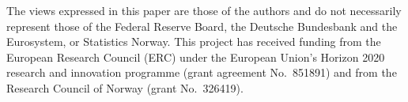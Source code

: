 \documentclass[\latexroot/\projectname]{subfiles}
\begin{document}

\newcommand{\thanksInput}[1]{%
  \IfFileExists{\latexroot/Subfiles/#1.tex}%
  {\ignorespaces\unskip}%
  {}%
}%

\whenintegrated{\label{funding-info}} %
\vspace{0.3\baselineskip}
\begin{minipage}{\textwidth}
  \footnotesize The views expressed in this paper are those of the authors and do not necessarily represent those of the Federal Reserve Board, the Deutsche Bundesbank and the Eurosystem, or Statistics Norway. This project has received funding from the European Research Council (ERC) under the European Union's Horizon 2020 research and innovation programme (grant agreement No.\ 851891) and from the Research Council of Norway (grant No.\ 326419).

  
\end{minipage}

%
\end{document}
